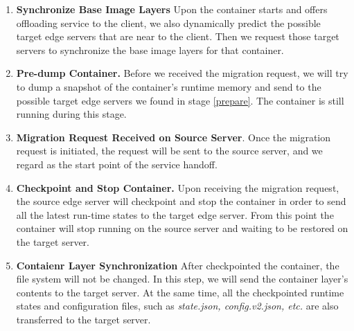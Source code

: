 \begin{enumerate}[label=\textbf{S\arabic*}]

\item 
\label{prepare} 
\textbf{
Synchronize Base Image Layers
} Upon the container starts and offers offloading service to the client, we also dynamically predict the possible target edge servers that are near to the client. Then we request those target servers to synchronize the base image layers for that container. 

\item \label{predump} \textbf{Pre-dump Container.} Before we received the migration request, we will try to dump a snapshot of the container's runtime memory and send to the possible target edge servers we found in stage \ref{prepare}. The container is still running during this stage. 

\item \label{request}\textbf{Migration Request Received on Source Server}. Once the migration request is initiated, the request will be sent to the source server, and we regard as the start point of the service handoff.


\item \label{checkpoint} \textbf{Checkpoint and Stop Container.} Upon receiving the migration request, the source edge server will checkpoint and stop the container in order to send all the latest run-time states to the target edge server.
From this point the container will stop running on the source server and waiting to be restored on the target server.

\item \label{fs-sync} \textbf{Contaienr Layer Synchronization} After checkpointed the container, the file system will not be changed. In this step, we will send the container layer's contents to the target server. At the same time, all the checkpointed runtime states and configuration files, such as \textit{state.json, config.v2.json, etc.} are also transferred to the target server. 


\end{enumerate}
